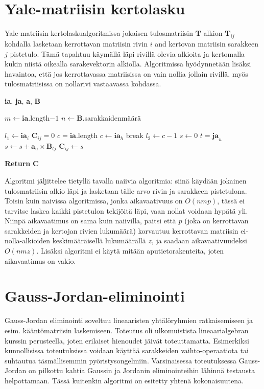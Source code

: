 \documentclass[a4paper]{article}
\begin{document}
\section*{Yale-matriisin kertolasku}
Yale-matriisin kertolaskualgoritmissa jokaisen tulosmatriisin $\textbf{T}$ alkion $\textbf{T}_{i j}$ kohdalla lasketaan kerrottavan matriisin rivin $i$ and kertovan matriisin sarakkeen $j$ pistetulo. Tämä tapahtuu käymällä läpi rivillä olevia alkioita ja kertomalla kukin niistä oikealla sarakevektorin alkiolla. Algoritmissa hyödynnetään lisäksi havaintoa, että jos kerrottavassa matriisissa on vain nollia jollain rivillä, myös tulosmatriisissa on nollarivi vastaavassa kohdassa.  
\vspace{0.5cm}
\begin{algorithmic}[1]
 {\textbf{ia}, \textbf{ja}, \textbf{a}, $\textbf{B}$}


\State $m\gets \textbf{ia}$.length$-1$
\State $n\gets \textbf{B}$.sarakkaidenmäärä

	\State $l_1\gets \textbf{ia}_i$
		\State $\textbf{C}_{i j}=0$
		\EndFor
	\Else
		\State $c=\textbf{ia}$.length
				\State $c \gets \textbf{ia}_h$
				\State break
			\EndIf
		\EndFor
		\State $l_2 \gets c-1$
		\State $s \gets 0 $
			\State $t=\textbf{ja}_u$
			\State $s \gets s+\textbf{a}_u\times \textbf{B}_{t j}$
		\EndFor
	\State $\textbf{C}_{i j} \gets s$
	\EndFor

	\EndIf
\EndFor
\State \textbf{Return} $\textbf{C}$
\EndProcedure
\end{algorithmic}
\vspace{0.5cm}
\noindent
Algoritmi jäljittelee tietyllä tavalla naiivia algoritmia: siinä käydään jokainen tulosmatriisin alkio läpi ja lasketaan tälle arvo rivin ja sarakkeen pistetulona. Toisin kuin naivissa algoritmissa, jonka aikavaativuus on $O(nmp)$, tässä ei tarvitse laskea kaikki pistetulon tekijöitä läpi, vaan nollat voidaan hypätä yli. Niinpä aikavaatimus on sama kuin naiivilla, paitsi että $p$ (joka on kerrottavan sarakkeiden ja kertojan rivien lukumäärä) korvautuu kerrottavan matriisin ei-nolla-alkioiden keskimääräisellä lukumäärällä $z$, ja saadaan aikavaativuudeksi $O(nmz)$. Lisäksi algoritmi ei käytä mitään aputietorakenteita, joten aikavaatimus on vakio.
\section*{Gauss-Jordan-eliminointi}
Gauss-Jordan eliminointi soveltuu lineaaristen yhtälöryhmien ratkaisemiseen ja esim. kääntömatriisin laskemiseen. Toteutus oli ulkomuistista lineaarialgebran kurssin perusteella, joten erilaiset hienoudet jäivät toteuttamatta. Esimerkiksi kunnollisissa toteutuksissa voidaan käyttää sarakkeiden vaihto-operaatiota tai suhtautua täsmällisemmin pyöristysongelmiin. Varsinaisessa toteutuksessa Gauss-Jordan on pilkottu kahtia Gaussin ja Jordanin eliminointeihin lähinnä testausta helpottamaan. Tässä kuitenkin algoritmi on esitetty yhtenä kokonaisuutena. 
\end{document}
